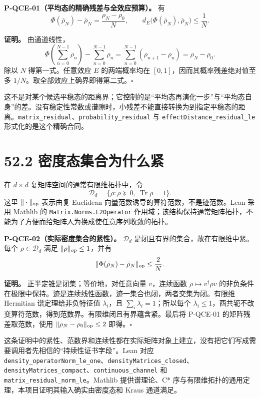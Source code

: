 \documentclass[
  11pt,
  oneside]{book}
\begin{document}
\protect\hypertarget{p-qce-01}{}{}

\textbf{P-QCE-01（平均态的精确残差与全效应预算）。} 有 \[
\Phi(\bar\rho_N)-\bar\rho_N=\frac{\rho_N-\rho_0}{N},
\qquad
d_E\bigl(\Phi(\bar\rho_N),\bar\rho_N\bigr)\le\frac1N.
\]

\textbf{证明。} 由通道线性， \[
\Phi\left(\sum_{n=0}^{N-1}\rho_n\right)-\sum_{n=0}^{N-1}\rho_n
=\sum_{n=0}^{N-1}(\rho_{n+1}-\rho_n)=\rho_N-\rho_0.
\] 除以 \(N\) 得第一式。任意效应 \(E\) 的两端概率均在
\([0,1]\)，因而其概率残差绝对值至多
\(1/N\)。取全部效应上确界即得第二式。\(\square\)

这不是对某个候选平稳态的距离界；它控制的是``平均态再演化一步''与``平均态自身''的差。没有稳定性常数或谱隙时，小残差不能直接转换为到指定平稳态的距离。\texttt{matrix\_\allowbreak residual}、\allowbreak \texttt{probability\_\allowbreak residual}
与 \texttt{effectDistance\_\allowbreak residual\_\allowbreak le} 形式化的是这个精确合同。

\hypertarget{ux5bc6ux5ea6ux6001ux96c6ux5408ux4e3aux4ec0ux4e48ux7d27}{%
\section{52.2
密度态集合为什么紧}\label{ux5bc6ux5ea6ux6001ux96c6ux5408ux4e3aux4ec0ux4e48ux7d27}}

在 \(d\times d\) 复矩阵空间的通常有限维拓扑中，令 \[
\mathcal D_d=\{\rho:\rho\succeq0,\ \operatorname{Tr}\rho=1\}.
\] 这里 \(\|\cdot\|_{\rm op}\) 表示由复 Euclidean
向量范数诱导的算符范数，不是迹范数。Lean 采用 Mathlib 的
\texttt{Matrix.Norms.L2Operator}
作用域；该结构保持通常矩阵拓扑，不能为了方便而给矩阵人为换成使任意序列收敛的拓扑。

\protect\hypertarget{p-qce-02}{}{}

\textbf{P-QCE-02（实际密度集合的紧性）。} \(\mathcal D_d\)
是闭且有界的集合，故在有限维中紧。每个 \(\rho\in\mathcal D_d\) 满足
\(\|\rho\|_{\rm op}\le1\)，并有 \[
\|\Phi(\bar\rho_N)-\bar\rho_N\|_{\rm op}\le\frac2N.
\]

\textbf{证明。} 正半定锥是闭集；等价地，对任意向量 \(v\)，连续函数
\(\rho\mapsto v^\dagger\rho v\)
的非负条件在极限中保持。迹是连续线性函数，迹一集合也闭，两者交集为闭。有限维
Hermitian 谱定理给非负特征值 \(\lambda_i\)，且
\(\sum_i\lambda_i=1\)；所以每个
\(\lambda_i\le1\)，酉共轭不改变算符范数，得到范数界。有限维闭且有界蕴含紧。最后将
P-QCE-01 的矩阵残差取范数，使用 \(\|\rho_N-\rho_0\|_{\rm op}\le2\)
即得。\(\square\)

这条证明中的紧性、范数界和连续性都在实际矩阵对象上建立，没有把它们写成需要调用者先相信的``持续性证书字段''。Lean
对应
\texttt{density\_\allowbreak operatorNorm\_\allowbreak le\_\allowbreak one}、\allowbreak \texttt{densityMatrices\_\allowbreak closed}、\allowbreak \texttt{densityMatrices\_\allowbreak compact}、\allowbreak \texttt{continuous\_\allowbreak channel}
和 \texttt{matrix\_\allowbreak residual\_\allowbreak norm\_\allowbreak le}。Mathlib 提供谱理论、C*
序与有限维拓扑的通用定理，本项目证明其输入确实由密度态和 Kraus
通道满足。
\end{document}
